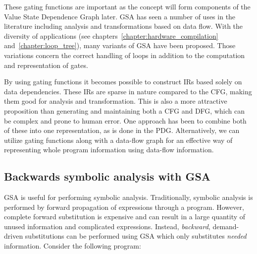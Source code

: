 These gating functions are important as the concept will form components of the Value State Dependence Graph later. 
GSA has seen a number of uses in the literature including analysis and transformations based on data flow. 
With the diversity of applications (see chapters~\ref{chapter:hardware_compilation} and~\ref{chapter:loop_tree}), many variants of GSA have been proposed. 
Those variations concern the correct handling of loops in addition to the computation and representation of gates.


By using gating functions it becomes possible to construct IRs based solely on data dependencies. 
These IRs are sparse in nature compared to the CFG, making them good for analysis and transformation. 
This is also a more attractive proposition than generating and maintaining both a CFG and DFG, which can be complex and prone to human error. 
One approach has been to combine both of these into one representation, as is done in the PDG. 
Alternatively, we can utilize gating functions along with a data-flow graph for an effective way of representing whole program information using data-flow information.

\subsection{Backwards symbolic analysis with GSA}
GSA is useful for performing symbolic analysis. 
Traditionally, symbolic analysis is performed by forward propagation of expressions through a program. 
However, complete forward substitution is expensive and can result in a large quantity of unused information and complicated expressions. 
Instead, \textit{backward}, demand-driven substitutions can be performed using GSA which only substitutes \textit{needed} information. 
Consider the following program:

